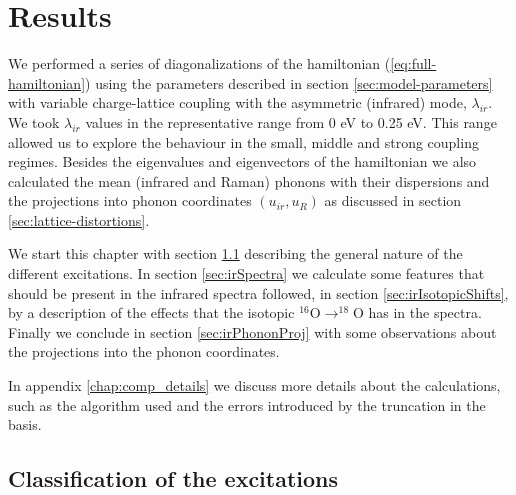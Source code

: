 \chapter{Results}
\label{chap:results}

We performed a series of diagonalizations of the hamiltonian (\ref{eq:full-hamiltonian}) using the parameters described in section \ref{sec:model-parameters} with variable charge-lattice coupling with the asymmetric (infrared) mode, $\lambda_{ir}$. 
We took $\lambda_{ir}$ values in the representative range from 0 eV to 0.25 eV. 
This range allowed us to explore the behaviour in the small, middle and strong coupling regimes. 
Besides the eigenvalues and eigenvectors of the hamiltonian we also calculated the mean (infrared and Raman) phonons with their dispersions and the projections into phonon coordinates $(u_{ir}, u_R)$ as discussed in section \ref{sec:lattice-distortions}.

We start this chapter with section \ref{sec:classification} describing the general nature of the different excitations. 
In section \ref{sec:irSpectra} we calculate some features that should be present in the infrared spectra followed, in section \ref{sec:irIsotopicShifts}, by a description of the effects that the isotopic $^{16}$O$\rightarrow ^{18}$O has in the spectra. 
Finally we conclude in section \ref{sec:irPhononProj} with some observations about the projections into the phonon coordinates.

In appendix \ref{chap:comp_details} we discuss more details about the calculations, such as the algorithm used and the errors introduced by the truncation in the basis.

\section{Classification of the excitations}
\label{sec:classification}

